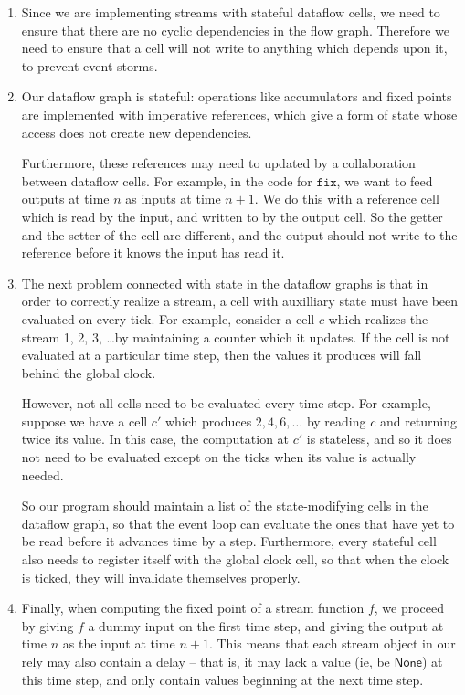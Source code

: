 \documentclass[preprint]{sigplanconf}
\newcommand{\term}[1]{\ensuremath{\mathtt{{#1}}}}
\newcommand{\None}{\mathsf{None}}
\begin{document}
\begin{enumerate}
\item Since we are implementing streams with stateful dataflow cells,
  we need to ensure that there are no cyclic dependencies in the flow
  graph. Therefore we need to ensure that a cell will not write to
  anything which depends upon it, to prevent event storms.

\item Our dataflow graph is stateful: operations like accumulators and
  fixed points are implemented with imperative references, which give
  a form of state whose access does not create new dependencies.

  Furthermore, these references may need to updated by a collaboration
  between dataflow cells. For example, in the code for \term{fix}, we
  want to feed outputs at time $n$ as inputs at time $n+1$. We do this
  with a reference cell which is read by the input, and written to by
  the output cell. So the getter and the setter of the cell are
  different, and the output should not write to the reference before
  it knows the input has read it.

\item The next problem connected with state in the dataflow graphs is
  that in order to correctly realize a stream, a cell with auxilliary
  state must have been evaluated on every tick. For example, consider
  a cell $c$ which realizes the stream 1, 2, 3, \ldots by maintaining
  a counter which it updates. If the cell is not evaluated at a
  particular time step, then the values it produces will fall behind
  the global clock.

  However, not all cells need to be evaluated every time step. For
  example, suppose we have a cell $c'$ which produces $2, 4, 6,
  \ldots$ by reading $c$ and returning twice its value. In this case,
  the computation at $c'$ is stateless, and so it does not need to be
  evaluated except on the ticks when its value is actually needed.

  So our program should maintain a list of the state-modifying cells in
  the dataflow graph, so that the event loop can evaluate the ones
  that have yet to be read before it advances time by a step. Furthermore, 
  every stateful cell also needs to register itself with the global clock
  cell, so that when the clock is ticked, they will invalidate themselves
  properly. 

\item Finally, when computing the fixed point of a stream function
  $f$, we proceed by giving $f$ a dummy input on the first time step,
  and giving the output at time $n$ as the input at time $n+1$. This
  means that each stream object in our rely may also contain a delay
  -- that is, it may lack a value (ie, be $\None$) at this time step,
  and only contain values beginning at the next time step.
\end{enumerate}
\end{document}
